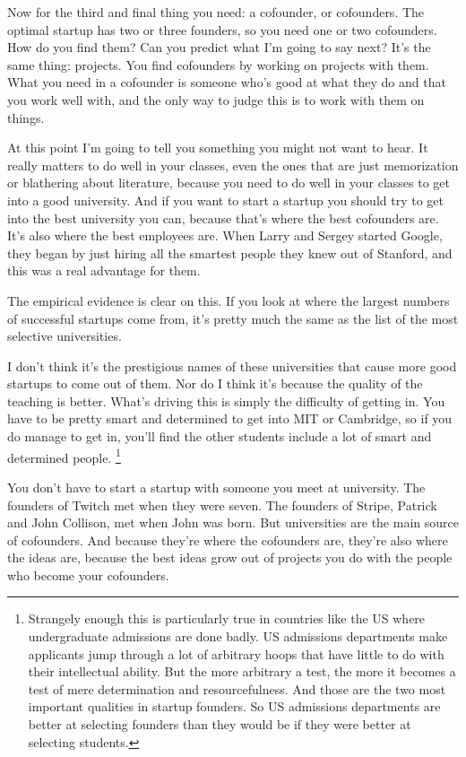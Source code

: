 Now for the third and final thing you need: a cofounder, or cofounders.
The optimal startup has two or three founders, so you need one or two
cofounders. How do you find them? Can you predict what I'm going to say
next? It's the same thing: projects. You find cofounders by working on
projects with them. What you need in a cofounder is someone who's good
at what they do and that you work well with, and the only way to judge
this is to work with them on things.

At this point I'm going to tell you something you might not want to
hear. It really matters to do well in your classes, even the ones that
are just memorization or blathering about literature, because you need
to do well in your classes to get into a good university. And if you
want to start a startup you should try to get into the best university
you can, because that's where the best cofounders are. It's also where
the best employees are. When Larry and Sergey started Google, they began
by just hiring all the smartest people they knew out of Stanford, and
this was a real advantage for them.

The empirical evidence is clear on this. If you look at where the
largest numbers of successful startups come from, it's pretty much the
same as the list of the most selective universities.

I don't think it's the prestigious names of these universities that
cause more good startups to come out of them. Nor do I think it's
because the quality of the teaching is better. What's driving this is
simply the difficulty of getting in. You have to be pretty smart and
determined to get into MIT or Cambridge, so if you do manage to get in,
you'll find the other students include a lot of smart and determined
people. \footnote{Strangely enough this is particularly true in countries like the
US where undergraduate admissions are done badly. US admissions
departments make applicants jump through a lot of arbitrary hoops that
have little to do with their intellectual ability. But the more
arbitrary a test, the more it becomes a test of mere determination and
resourcefulness. And those are the two most important qualities in
startup founders. So US admissions departments are better at selecting
founders than they would be if they were better at selecting students.}

You don't have to start a startup with someone you meet at university.
The founders of Twitch met when they were seven. The founders of Stripe,
Patrick and John Collison, met when John was born. But universities are
the main source of cofounders. And because they're where the cofounders
are, they're also where the ideas are, because the best ideas grow out
of projects you do with the people who become your cofounders.

